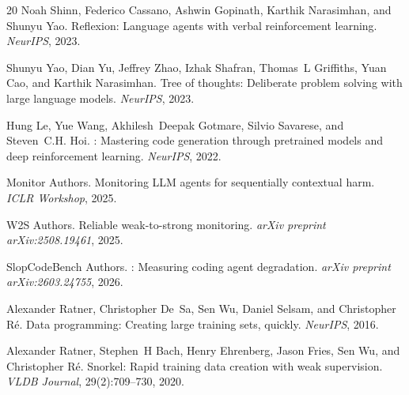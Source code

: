\documentclass[11pt,a4paper]{article}
\begin{document}
\begin{thebibliography}{20}
Noah Shinn, Federico Cassano, Ashwin Gopinath, Karthik Narasimhan, and Shunyu Yao.
\newblock Reflexion: Language agents with verbal reinforcement learning.
\newblock \emph{NeurIPS}, 2023.

Shunyu Yao, Dian Yu, Jeffrey Zhao, Izhak Shafran, Thomas~L Griffiths, Yuan Cao, and Karthik Narasimhan.
\newblock Tree of thoughts: Deliberate problem solving with large language models.
\newblock \emph{NeurIPS}, 2023.

Hung Le, Yue Wang, Akhilesh~Deepak Gotmare, Silvio Savarese, and Steven~C.H. Hoi.
: Mastering code generation through pretrained models and deep reinforcement learning.
\newblock \emph{NeurIPS}, 2022.

{Monitor Authors}.
\newblock Monitoring {LLM} agents for sequentially contextual harm.
\newblock \emph{ICLR Workshop}, 2025.

{W2S Authors}.
\newblock Reliable weak-to-strong monitoring.
\newblock \emph{arXiv preprint arXiv:2508.19461}, 2025.

{SlopCodeBench Authors}.
: Measuring coding agent degradation.
\newblock \emph{arXiv preprint arXiv:2603.24755}, 2026.

Alexander Ratner, Christopher De~Sa, Sen Wu, Daniel Selsam, and Christopher R{\'e}.
\newblock Data programming: Creating large training sets, quickly.
\newblock \emph{NeurIPS}, 2016.

Alexander Ratner, Stephen~H Bach, Henry Ehrenberg, Jason Fries, Sen Wu, and Christopher R{\'e}.
\newblock Snorkel: Rapid training data creation with weak supervision.
\newblock \emph{VLDB Journal}, 29(2):709--730, 2020.

\end{thebibliography}
\end{document}
